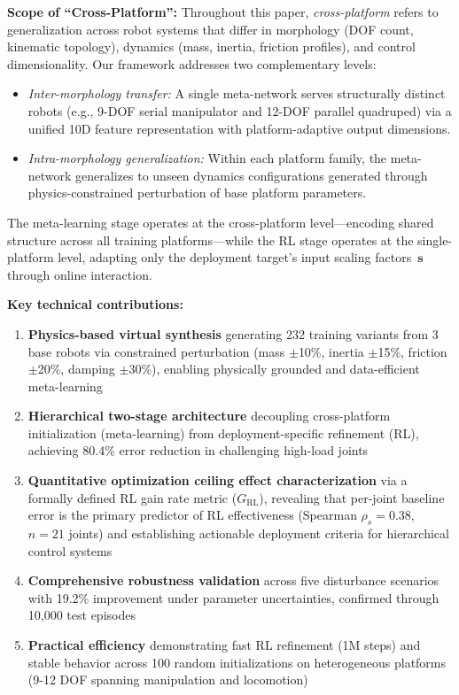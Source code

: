 \documentclass[DTMColor]{ROB-New}
\newcommand{\rev}[1]{{\color{blue}#1}}
\begin{document}
{\color{blue}
\textbf{Scope of ``Cross-Platform'':} Throughout this paper, \textit{cross-platform} refers to generalization across robot systems that differ in morphology (DOF count, kinematic topology), dynamics (mass, inertia, friction profiles), and control dimensionality. Our framework addresses two complementary levels:
\begin{itemize}[leftmargin=*, itemsep=1pt]
    \item \textit{Inter-morphology transfer:} A single meta-network serves structurally distinct robots (e.g., 9-DOF serial manipulator and 12-DOF parallel quadruped) via a unified 10D feature representation with platform-adaptive output dimensions.
    \item \textit{Intra-morphology generalization:} Within each platform family, the meta-network generalizes to unseen dynamics configurations generated through physics-constrained perturbation of base platform parameters.
\end{itemize}
The meta-learning stage operates at the cross-platform level---encoding shared structure across all training platforms---while the RL stage operates at the single-platform level, adapting only the deployment target's input scaling factors~$\bm{s}$ through online interaction.
}

\textbf{Key technical contributions:}

\begin{enumerate}[leftmargin=*, itemsep=2pt]
    \item \textbf{Physics-based virtual synthesis} generating 232 training variants from 3 base robots via constrained perturbation (mass $\pm$10\%, inertia $\pm$15\%, friction $\pm$20\%, \rev{damping $\pm$30\%}), enabling physically grounded and data-efficient meta-learning
    \item \textbf{Hierarchical two-stage architecture} decoupling cross-platform initialization (meta-learning) from deployment-specific refinement (RL), achieving 80.4\% error reduction in challenging high-load joints
    \item {\color{blue}\textbf{Quantitative optimization ceiling effect characterization} via a formally defined RL gain rate metric ($G_{\mathrm{RL}}$), revealing that per-joint baseline error is the primary predictor of RL effectiveness (Spearman $\rho_s = 0.38$, $n=21$ joints) and establishing actionable deployment criteria for hierarchical control systems}
    \item \textbf{Comprehensive robustness validation} across five disturbance scenarios with 19.2\% improvement under parameter uncertainties, confirmed through 10,000 test episodes
    \item \textbf{Practical efficiency} demonstrating fast RL refinement (1M steps) and stable behavior across 100 random initializations on heterogeneous platforms (9-12 DOF spanning manipulation and locomotion)
\end{enumerate}
\end{document}
